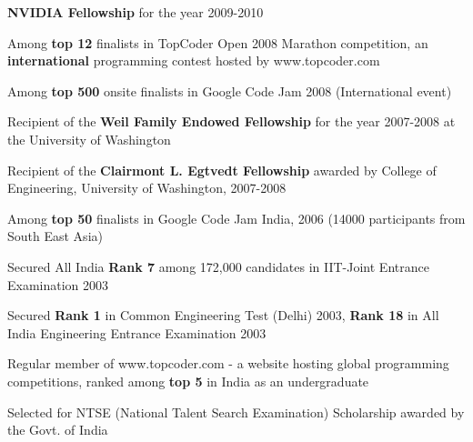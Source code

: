 \documentclass[10pt]{article}
\newenvironment{itemize*}%
  {\begin{itemize}%
    \setlength{\itemsep}{0pt}%
    \setlength{\parskip}{0pt}%
	}
  {\end{itemize}}
\begin{document}
\begin{itemize*}
\item \textbf{NVIDIA Fellowship} for the year 2009-2010
\item Among \textbf{top 12} finalists in TopCoder Open 2008 Marathon competition, an \textbf{international} programming contest hosted by www.topcoder.com
\item Among \textbf{top 500} onsite finalists in Google Code Jam 2008 (International event)
\item Recipient of the \textbf{Weil Family Endowed Fellowship} for the year 2007-2008 at the University of Washington
\item Recipient of the \textbf{Clairmont L. Egtvedt Fellowship} awarded by College of Engineering, University of Washington, 2007-2008
\item Among \textbf{top 50} finalists in Google Code Jam India, 2006 (14000 participants from South East Asia)
\item Secured All India \textbf{Rank 7} among 172,000 candidates in IIT-Joint Entrance Examination 2003
\item Secured \textbf{Rank 1} in Common Engineering Test (Delhi) 2003, \textbf{Rank 18} in All India Engineering Entrance Examination 2003
\item Regular member of www.topcoder.com - a website hosting global programming competitions, ranked among \textbf{top 5} in India as an undergraduate
\item Selected for NTSE (National Talent Search Examination) Scholarship awarded by the Govt. of India
\end{itemize*}
\end{document}
